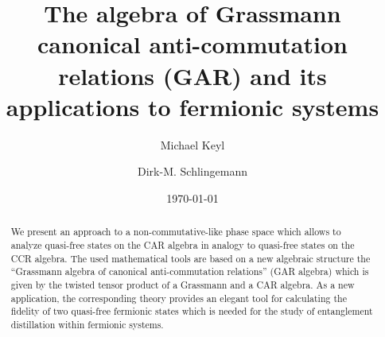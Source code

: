 \documentclass[pra,twoside,amsmath,amsfonts,amssymb,superscriptaddress,showpacs]{revtex4}
\begin{document}
\title{The algebra of Grassmann canonical anti-commutation relations (GAR) and its applications to
fermionic systems}

\author{Michael Keyl}



\author{Dirk-M. Schlingemann}




\date{\today}


\begin{abstract}
We present an approach to a non-commutative-like phase space which allows to analyze quasi-free
states on the CAR algebra in analogy to quasi-free states on the CCR algebra. The used mathematical
tools are based on a new algebraic structure the ``Grassmann algebra of canonical anti-commutation
relations'' (GAR algebra) which
is given by the twisted tensor product of a Grassmann and a CAR algebra. As a new application, the
corresponding theory provides an elegant tool for calculating the fidelity of two quasi-free
fermionic states which is needed for the study of entanglement distillation within fermionic
systems.
\end{abstract}
\maketitle
\pagestyle{fancy}
\end{document}
